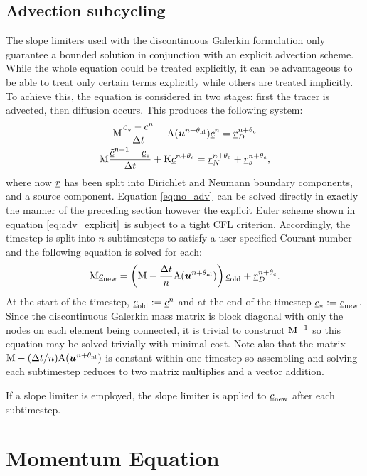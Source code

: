 \subsection{Advection subcycling}

The slope limiters used with the discontinuous Galerkin formulation only
guarantee a bounded solution in conjunction with an explicit advection
scheme. While the whole equation could be treated explicitly, it can be advantageous
to be able to treat only certain terms explicitly while others are treated implicitly.
To achieve this, the equation is considered in two stages: first the
tracer is advected, then diffusion occurs. This produces the following
system:
\begin{gather}
  \mathrm{M} \frac{\underline{c}_*-\underline{c}^{n}}{\Delta t}
  +\mathrm{A}({\mbox{\boldmath$u$}}^{n+\theta_{\mathrm{nl}}})\underline{c}^{n}=\underline{r}_D^{n+\theta_c}\label{eq:adv_explicit}\\
  \mathrm{M} \frac{\underline{\tilde c}^{n+1}-\underline{c}_*}{\Delta t}
  +\mathrm{K}\underline{c}^{n+\theta_c}=\underline{r}_N^{n+\theta_c}+\underline{r}_s^{n+\theta_c}\label{eq:no_adv},
\end{gather}
where now $\underline{r}$ has been split into Dirichlet and Neumann boundary
components, and a source component. Equation \eqref{eq:no_adv}\ can be
solved directly in exactly the manner of the preceding section however the
explicit Euler scheme shown in equation \eqref{eq:adv_explicit}\ is subject
to a tight CFL criterion. Accordingly, the timestep is split into $n$
subtimesteps to satisfy a user-specified Courant number and the following
equation is solved for each:
\begin{equation}
  \mathrm{M} \underline{c}_{\mathrm{new}}=\left(\mathrm{M}-\frac{\Delta t}{n}\mathrm{A}({\mbox{\boldmath$u$}}^{n+\theta_{\mathrm{nl}}})\right) \underline{c}_{\mathrm{old}}+\underline{r}_D^{n+\theta_c}.
\end{equation}
At the start of the timestep, $\underline{c}_{\mathrm{old}}:=\underline{c}^{n}$ and at the
end of the timestep $\underline{c}_*:=\underline{c}_{\mathrm{new}}$.
Since the discontinuous Galerkin mass matrix is block diagonal with only the
nodes on each element being connected, it is trivial to construct
$\mathrm{M}^{-1}$ so this equation may be solved trivially with minimal cost. Note also that the
matrix $\mathrm{M}-(\Delta t/n)\mathrm{A}({\mbox{\boldmath$u$}}^{n+\theta_{\mathrm{nl}}})$ is constant within one timestep
so assembling and solving each subtimestep reduces to two matrix
multiplies and a vector addition.

If a slope limiter is employed, the slope limiter is applied to
$\underline{c}_{\mathrm{new}}$ after each subtimestep.

\section{Momentum Equation}

